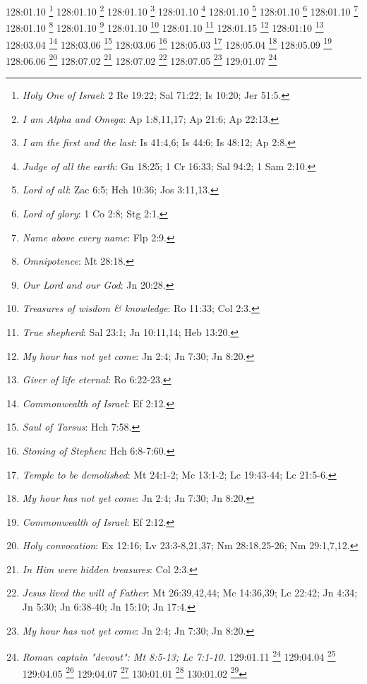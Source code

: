 {{{{{{{{{{{{{{{{{{{{{{{{{{{{{128:01.10 \footnote{\textit{Holy One of Israel}: 2 Re 19:22; Sal 71:22; Is 10:20; Jer 51:5.}
128:01.10 \footnote{\textit{I am Alpha and Omega}: Ap 1:8,11,17; Ap 21:6; Ap 22:13.}
128:01.10 \footnote{\textit{I am the first and the last}: Is 41:4,6; Is 44:6; Is 48:12; Ap 2:8.}
128:01.10 \footnote{\textit{Judge of all the earth}: Gn 18:25; 1 Cr 16:33; Sal 94:2; 1 Sam 2:10.}
128:01.10 \footnote{\textit{Lord of all}: Zac 6:5; Hch 10:36; Jos 3:11,13.}
128:01.10 \footnote{\textit{Lord of glory}: 1 Co 2:8; Stg 2:1.}
128:01.10 \footnote{\textit{Name above every name}: Flp 2:9.}
128:01.10 \footnote{\textit{Omnipotence}: Mt 28:18.}
128:01.10 \footnote{\textit{Our Lord and our God}: Jn 20:28.}
128:01.10 \footnote{\textit{Treasures of wisdom & knowledge}: Ro 11:33; Col 2:3.}
128:01.10 \footnote{\textit{True shepherd}: Sal 23:1; Jn 10:11,14; Heb 13:20.}
128:01.15 \footnote{\textit{My hour has not yet come}: Jn 2:4; Jn 7:30; Jn 8:20.}
128:01:10 \footnote{\textit{Giver of life eternal}: Ro 6:22-23.}
128:03.04 \footnote{\textit{Commonwealth of Israel}: Ef 2:12.}
128:03.06 \footnote{\textit{Saul of Tarsus}: Hch 7:58.}
128:03.06 \footnote{\textit{Stoning of Stephen}: Hch 6:8-7:60.}
128:05.03 \footnote{\textit{Temple to be demolished}: Mt 24:1-2; Mc 13:1-2; Lc 19:43-44; Lc 21:5-6.}
128:05.04 \footnote{\textit{My hour has not yet come}: Jn 2:4; Jn 7:30; Jn 8:20.}
128:05.09 \footnote{\textit{Commonwealth of Israel}: Ef 2:12.}
128:06.06 \footnote{\textit{Holy convocation}: Ex 12:16; Lv 23:3-8,21,37; Nm 28:18,25-26; Nm 29:1,7,12.}
128:07.02 \footnote{\textit{In Him were hidden treasures}: Col 2:3.}
128:07.02 \footnote{\textit{Jesus lived the will of Father}: Mt 26:39,42,44; Mc 14:36,39; Lc 22:42; Jn 4:34; Jn 5:30; Jn 6:38-40; Jn 15:10; Jn 17:4.}
128:07.05 \footnote{\textit{My hour has not yet come}: Jn 2:4; Jn 7:30; Jn 8:20.}
129:01.07 \footnote{\textit{Roman captain "devout": Mt 8:5-13; Lc 7:1-10.}
129:01.11 \footnote{\textit{The "Master"}: Mt 8:19; Mc 4:38; Lc 3:12; Jn 1:38.}
129:04.04 \footnote{\textit{Man of sorrows, knew grief}: Is 53:3.}
129:04.05 \footnote{\textit{Jesus' human experiences}: Heb 2:14-18; Heb 4:15.}
129:04.07 \footnote{\textit{Jesus, the new and living way}: Jn 14:6; Heb 10:20.}
130:01.01 \footnote{\textit{Gadiah and Simon}: Hch 10:5-6.}
130:01.02 \footnote{\textit{Did fish swallow Jonah?: Jon 1:17.}
130:01.02 \footnote{\textit{Jonah embarks}: Jon 1:3.}
130:01.03 \footnote{\textit{Dorcas' house in Joppa}: Hch 9:36-42.}
130:01.03 \footnote{\textit{Simon the tanner's conversion}: Hch 9:43.}
130:01.05 \footnote{\textit{God is love}: 1 Jn 4:8,16.}
130:01.06 \footnote{\textit{Wheat and tares}: Mt 13:24-30.}
}}}}}}}}}}}}}}}}}}}}}}}}}}}}}}}
